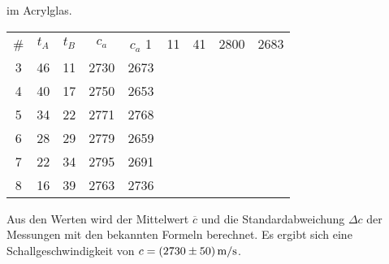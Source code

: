 im Acrylglas.
\begin{table}
    \centering
    \begin{tabular}[pos]{S S S S S}
        {#}& {$t_A$} & {$t_B$} & {$c_a$} & {$c_a$}
        1       &  11    & 41    & 2800          & 2683          \\
        3       &  46    & 11    & 2730          & 2673          \\
        4       &  40    & 17    & 2750          & 2653          \\
        5       &  34    & 22    & 2771          & 2768          \\
        6       &  28    & 29    & 2779          & 2659          \\
        7       &  22    & 34    & 2795          & 2691          \\
        8       &  16    & 39    & 2763          & 2736          \\
    \end{tabular}
\end{table}
Aus den Werten wird der Mittelwert $\overline{c}$ und die Standardabweichung $\Delta c$ der Messungen mit den bekannten Formeln berechnet.
Es ergibt sich eine Schallgeschwindigkeit von $c = \qty{2730 +- 50}{\meter\per\second}$.

